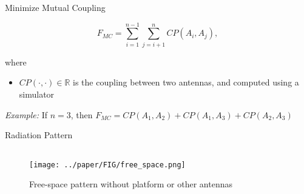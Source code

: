 \documentclass{beamer}
\begin{document}
\begin{frame}{Minimize Mutual Coupling}
    \begin{tcolorbox}[colback=green!5]
        \begin{equation}
            F_{MC} = \sum_{i=1}^{n-1}\sum_{j=i+1}^{n} CP(A_i, A_j),
        \end{equation}
    \end{tcolorbox}
    where
    \begin{itemize}
        \item $CP(\cdot, \cdot) \in \mathbb R$ is the coupling between two antennas, and computed using a simulator
    \end{itemize}
    \vspace{2mm}
    \small\textit{Example:} If $n=3$, then $F_{MC} = CP(A_1, A_2) + CP(A_1, A_3) + CP(A_2, A_3)$
\end{frame}

\begin{frame}{Radiation Pattern}
    \begin{columns}
        \begin{column}{0.5\linewidth}
            \begin{figure}
                \vspace*{-1cm}
                \centering
                \texttt{[image: ../paper/FIG/free\_space.png]}
                \caption*{\tiny{Free-space pattern without platform or other antennas}}
            \end{figure}
        \end{column}
        \begin{column}{0.5\linewidth}
        \end{column}
    \end{columns}
\end{frame}
\end{document}
